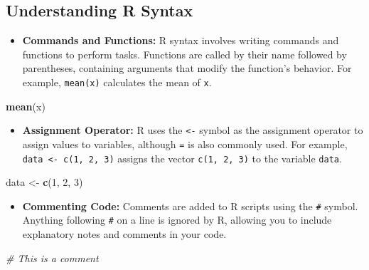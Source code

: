 \documentclass[
]{book}
\newenvironment{Shaded}{\begin{snugshade}}{\end{snugshade}}
\newcommand{\CommentTok}[1]{\textcolor[rgb]{0.56,0.35,0.01}{\textit{#1}}}
\newcommand{\DecValTok}[1]{\textcolor[rgb]{0.00,0.00,0.81}{#1}}
\newcommand{\FunctionTok}[1]{\textcolor[rgb]{0.13,0.29,0.53}{\textbf{#1}}}
\newcommand{\NormalTok}[1]{#1}
\newcommand{\OtherTok}[1]{\textcolor[rgb]{0.56,0.35,0.01}{#1}}
\providecommand{\tightlist}{%
  \setlength{\itemsep}{0pt}\setlength{\parskip}{0pt}}
\begin{document}
\subsection*{Understanding R Syntax}\label{understanding-r-syntax}

\begin{itemize}
\tightlist
\item
  \textbf{Commands and Functions:} R syntax involves writing commands and functions to perform tasks. Functions are called by their name followed by parentheses, containing arguments that modify the function's behavior. For example, \texttt{mean(x)} calculates the mean of \texttt{x}.
\end{itemize}

\begin{Shaded}
\begin{Highlighting}[]
\FunctionTok{mean}\NormalTok{(x)}
\end{Highlighting}
\end{Shaded}

\begin{itemize}
\tightlist
\item
  \textbf{Assignment Operator:} R uses the \texttt{\textless{}-} symbol as the assignment operator to assign values to variables, although \texttt{=} is also commonly used. For example, \texttt{data\ \textless{}-\ c(1,\ 2,\ 3)} assigns the vector \texttt{c(1,\ 2,\ 3)} to the variable \texttt{data}.
\end{itemize}

\begin{Shaded}
\begin{Highlighting}[]
\NormalTok{data }\OtherTok{\textless{}{-}} \FunctionTok{c}\NormalTok{(}\DecValTok{1}\NormalTok{, }\DecValTok{2}\NormalTok{, }\DecValTok{3}\NormalTok{)}
\end{Highlighting}
\end{Shaded}

\begin{itemize}
\tightlist
\item
  \textbf{Commenting Code:} Comments are added to R scripts using the \texttt{\#} symbol. Anything following \texttt{\#} on a line is ignored by R, allowing you to include explanatory notes and comments in your code.
\end{itemize}

\begin{Shaded}
\begin{Highlighting}[]
\CommentTok{\# This is a comment}
\end{Highlighting}
\end{Shaded}
\end{document}
